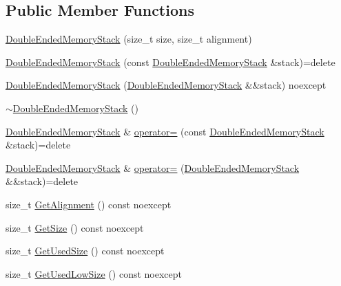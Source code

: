 \subsection*{Public Member Functions}
\begin{DoxyCompactItemize}
\item 
\hyperlink{classmage_1_1_double_ended_memory_stack_a6480666c03ac703fc4fd5a62a766438d}{Double\+Ended\+Memory\+Stack} (size\+\_\+t size, size\+\_\+t alignment)
\item 
\hyperlink{classmage_1_1_double_ended_memory_stack_a8a903d4a209929854a6f50cf98e3e2da}{Double\+Ended\+Memory\+Stack} (const \hyperlink{classmage_1_1_double_ended_memory_stack}{Double\+Ended\+Memory\+Stack} \&stack)=delete
\item 
\hyperlink{classmage_1_1_double_ended_memory_stack_a89d83095cc04686b9775fc4a55a5ff30}{Double\+Ended\+Memory\+Stack} (\hyperlink{classmage_1_1_double_ended_memory_stack}{Double\+Ended\+Memory\+Stack} \&\&stack) noexcept
\item 
\hyperlink{classmage_1_1_double_ended_memory_stack_afaac4a28ea1e386bc83d3e07fd5531a0}{$\sim$\+Double\+Ended\+Memory\+Stack} ()
\item 
\hyperlink{classmage_1_1_double_ended_memory_stack}{Double\+Ended\+Memory\+Stack} \& \hyperlink{classmage_1_1_double_ended_memory_stack_aafcc4b3cd8d87d75cc3de53994b6ef7e}{operator=} (const \hyperlink{classmage_1_1_double_ended_memory_stack}{Double\+Ended\+Memory\+Stack} \&stack)=delete
\item 
\hyperlink{classmage_1_1_double_ended_memory_stack}{Double\+Ended\+Memory\+Stack} \& \hyperlink{classmage_1_1_double_ended_memory_stack_a95b220925f1ef732c104901c3f55015d}{operator=} (\hyperlink{classmage_1_1_double_ended_memory_stack}{Double\+Ended\+Memory\+Stack} \&\&stack)=delete
\item 
size\+\_\+t \hyperlink{classmage_1_1_double_ended_memory_stack_a6f2d4036e67cca2836293ad421ddfdfd}{Get\+Alignment} () const noexcept
\item 
size\+\_\+t \hyperlink{classmage_1_1_double_ended_memory_stack_a68d69d69243d5ef8a9fd12b7d7a42993}{Get\+Size} () const noexcept
\item 
size\+\_\+t \hyperlink{classmage_1_1_double_ended_memory_stack_ae9c3c9a0f4e330b20ef63e0a21b91459}{Get\+Used\+Size} () const noexcept
\item 
size\+\_\+t \hyperlink{classmage_1_1_double_ended_memory_stack_af7fd015832d8c6c56619917492e62a2e}{Get\+Used\+Low\+Size} () const noexcept
\item 

\end{DoxyCompactItemize}
